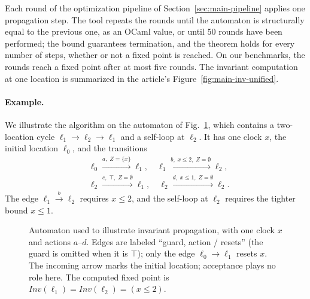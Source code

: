 Each round of the optimization pipeline of Section~\ref{sec:main-pipeline}
applies one propagation step.  The tool repeats the rounds until the
automaton is structurally equal to the previous one, as an OCaml value, or
until 50 rounds have been performed; the bound guarantees termination, and the
theorem holds for every number of steps, whether or not a fixed point is
reached.  On our benchmarks, the rounds reach a fixed point after at most five
rounds.
The invariant computation at one location is summarized in the article's
Figure~\ref{fig:main-inv-unified}.

\paragraph{Example.}
We illustrate the algorithm on the automaton of Fig.~\ref{fig:inv-example},
which contains a two-location cycle $\ell_1\to\ell_2\to\ell_1$ and a self-loop
at $\ell_2$.  It has one clock $x$, the initial location $\ell_0$, and the
transitions
\[
\begin{aligned}
&\ell_0 \xrightarrow{a,\;Z=\{x\}} \ell_1,\quad
 \ell_1 \xrightarrow{b,\;x\le 2,\;Z=\emptyset} \ell_2,\\
&\ell_2 \xrightarrow{c,\;\top,\;Z=\emptyset} \ell_1,\quad
 \ell_2 \xrightarrow{d,\;x\le 1,\;Z=\emptyset} \ell_2.
\end{aligned}
\]
The edge $\ell_1\xrightarrow{b}\ell_2$ requires $x\le2$, and the self-loop at
$\ell_2$ requires the tighter bound $x\le1$.

\begin{figure}[t]
\centering

\caption{Automaton used to illustrate invariant propagation, with one clock $x$
and actions $a$--$d$.  Edges are labeled ``guard, action / resets'' (the guard
is omitted when it is $\top$); only the edge $\ell_0\to\ell_1$ resets $x$.  The
incoming arrow marks the initial location; acceptance plays no role here.  The
computed fixed point is $\mathit{Inv}(\ell_1)=\mathit{Inv}(\ell_2)=(x\le2)$.}
\label{fig:inv-example}
\end{figure}

